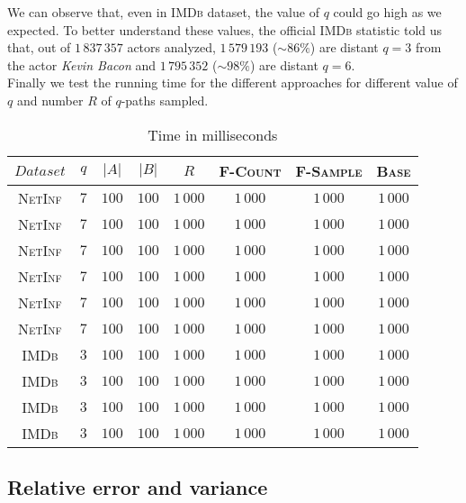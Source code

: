 	We can observe that, even in \textsc{IMDb} dataset, the value of $q$ could go high as we expected. To better understand these values, the official \textsc{IMDb} statistic\cite{imdbstat} told us that, out of $1\,837\,357$ actors analyzed, $1\,579\,193$ ($\sim86\%$) are distant $q=3$ from the actor \textit{Kevin Bacon} and $1\,795\,352$ ($\sim98\%$) are distant $q=6$.\\
	
	Finally we test the running time for the different approaches for different value of $q$ and number $R$ of $q$-paths sampled.
	
	\begin{table}[h]
		\centering
		\label{my-label}
		\begin{tabular}{|c|c|c|c|c|c|c|c|}
			\hline
			$Dataset$       & $q$  & $|A|$ & $|B|$ & $R$ & \textsc{F-Count} & \textsc{F-Sample} & \textsc{Base} \\ \hline
			\textsc{NetInf} & $7$  & $100$ & $100$ & $1\,000$ & $1\,000$ & $1\,000$ & $1\,000$ \\ \hline
			\textsc{NetInf} & $7$  & $100$ & $100$ & $1\,000$ & $1\,000$ & $1\,000$ & $1\,000$ \\ \hline
			\textsc{NetInf} & $7$  & $100$ & $100$ & $1\,000$ & $1\,000$ & $1\,000$ & $1\,000$ \\ \hline
			\textsc{NetInf} & $7$  & $100$ & $100$ & $1\,000$ & $1\,000$ & $1\,000$ & $1\,000$ \\ \hline
			\textsc{NetInf} & $7$  & $100$ & $100$ & $1\,000$ & $1\,000$ & $1\,000$ & $1\,000$ \\ \hline
			\textsc{NetInf} & $7$  & $100$ & $100$ & $1\,000$ & $1\,000$ & $1\,000$ & $1\,000$ \\ \hline
			\textsc{IMDb}   & $3$  & $100$ & $100$ & $1\,000$ & $1\,000$ & $1\,000$ & $1\,000$ \\ \hline
			\textsc{IMDb}   & $3$  & $100$ & $100$ & $1\,000$ & $1\,000$ & $1\,000$ & $1\,000$ \\ \hline
			\textsc{IMDb}   & $3$  & $100$ & $100$ & $1\,000$ & $1\,000$ & $1\,000$ & $1\,000$ \\ \hline
			\textsc{IMDb}   & $3$  & $100$ & $100$ & $1\,000$ & $1\,000$ & $1\,000$ & $1\,000$ \\ \hline
			
		\end{tabular}
		\caption{Time in milliseconds}
	\end{table}
	
	
	
	\subsection*{Relative error and variance}
	
